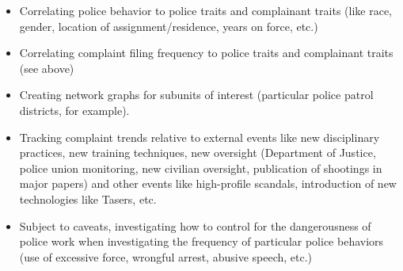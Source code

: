 \documentclass{article}
\begin{document}
\begin{itemize}
	\item Correlating police behavior to police traits and complainant traits (like race, gender, location of assignment/residence, years on force, etc.)
	\item Correlating complaint filing frequency to police traits and complainant traits (see above)
	\item Creating network graphs for subunits of interest (particular police patrol districts, for example).
	\item Tracking complaint trends relative to external events like new disciplinary practices, new training techniques, new oversight (Department of Justice, police union monitoring, new civilian oversight, publication of shootings in major papers) and other events like high-profile scandals, introduction of new technologies like Tasers, etc.
	\item Subject to caveats, investigating how to control for the dangerousness of police work when investigating the frequency of particular police behaviors (use of excessive force, wrongful arrest, abusive speech, etc.)
\end{itemize}
\end{document}
